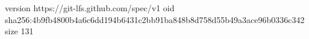 version https://git-lfs.github.com/spec/v1
oid sha256:4b9fb4800b4a6c6dd194b6431c2bb91ba848b8d758d55b49a3ace96b0336c342
size 131

